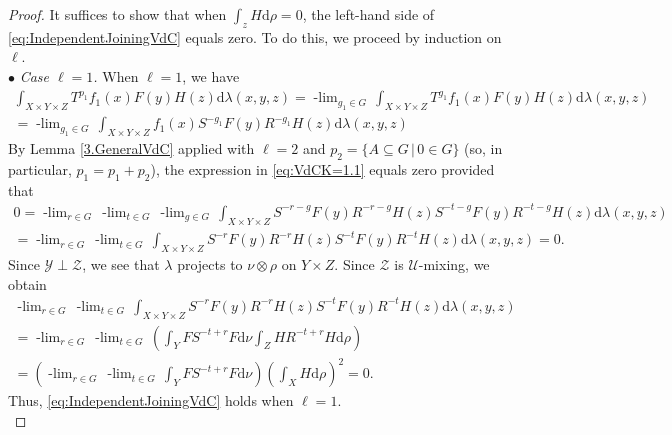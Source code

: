\documentclass[graybox]{svmult}
\theoremstyle{definition}
\newcommand{\plimgG}[3]{\mathop {#1\text{-lim}}_{#2\in #3}\,}
\begin{document}
\begin{proof}
It suffices to show that when $\int_z H\text{d}\rho=0$, the left-hand side of \eqref{eq:IndependentJoiningVdC} equals zero. 
To do this, we proceed by induction on $\ell$.\\

$\bullet$ \textit{ Case $\ell=1$.} When $\ell=1$, we have 
\begin{multline}\label{eq:VdCK=1.1}
\int_{X\times Y\times Z} T^{p_1}f_1(x)F(y)H(z)\text{d}\lambda(x,y,z)=
\plimgG{p_1}{g_1}{G}\int_{X\times Y\times Z} T^{g_1}f_1(x)F(y)H(z)\text{d}\lambda(x,y,z) \\
=\plimgG{p_1}{g_1}{G}\int_{X\times Y\times Z} f_1(x)S^{-g_1}F(y)R^{-g_1}H(z)\text{d}\lambda(x,y,z)
\end{multline}
By Lemma \ref{3.GeneralVdC} applied with $\ell=2$ and $p_2=\{A\subseteq G\,|\,0\in G\}$ (so, in particular, $p_1=p_1+p_2$), the expression in \eqref{eq:VdCK=1.1} equals zero provided that 
\begin{multline}\label{eq:VdCk=1.2}
0=\plimgG{p_1}{r}{G}\plimgG{p_1}{t}{G}\plimgG{p_2}{g}{G}\int_{X\times Y\times Z} S^{-r-g}F(y)R^{-r-g}H(z)S^{-t-g}F(y)R^{-t-g}H(z)\text{d}\lambda(x,y,z)\\
=\plimgG{p_1}{r}{G}\plimgG{p_1}{t}{G}\int_{X\times Y\times Z} S^{-r}F(y)R^{-r}H(z)S^{-t}F(y)R^{-t}H(z)\text{d}\lambda(x,y,z)=0.
\end{multline}
Since $\mathcal{Y}\perp\mathcal{Z}$, we see that $\lambda$ projects to $\nu\otimes\rho$ on $Y\times Z$.
Since $\mathcal Z$ is $\mathcal U$-mixing, we obtain
\begin{multline}
    \plimgG{p_1}{r}{G}\plimgG{p_1}{t}{G}\int_{X\times Y\times Z} S^{-r}F(y)R^{-r}H(z)S^{-t}F(y)R^{-t}H(z)\text{d}\lambda(x,y,z)\\
    = \plimgG{p_1}{r}{G}\plimgG{p_1}{t}{G}\left(\int_{Y}FS^{-t+r}F\text{d}\nu\int_Z HR^{-t+r}H\text{d}\rho\right)\\
    =\left(\plimgG{p_1}{r}{G}\plimgG{p_1}{t}{G}\int_{Y}FS^{-t+r}F\text{d}\nu\right)\left(\int_X H\text{d}\rho\right)^2=0.
\end{multline}
Thus, \eqref{eq:IndependentJoiningVdC} holds when $\ell=1$.\\ 


\end{proof}
\end{document}
